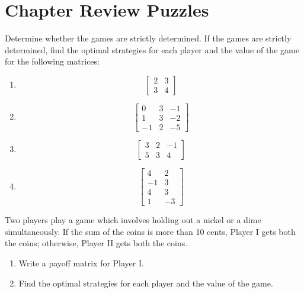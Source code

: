 \section{Chapter Review Puzzles}

\begin{puzzle}
    Determine whether the games are strictly determined. If the games are strictly determined, find the optimal strategies for each player and the value of the game for the following matrices:
    \begin{enumerate}
        \item \[
                  \begin{bmatrix}
                      2 & 3 \\
                      3 & 4
                  \end{bmatrix}
              \]
        \item \[
                  \begin{bmatrix}
                      0  & 3 & -1 \\
                      1  & 3 & -2 \\
                      -1 & 2 & -5
                  \end{bmatrix}
              \]
        \item \[
                  \begin{bmatrix}
                      3 & 2 & -1 \\
                      5 & 3 & 4
                  \end{bmatrix}
              \]
        \item
              \[
                  \begin{bmatrix}
                      4  & 2  \\
                      -1 & 3  \\
                      4  & 3  \\
                      1  & -3
                  \end{bmatrix}
              \]
    \end{enumerate}
\end{puzzle}

\begin{puzzle}
    Two players play a game which involves holding out a nickel or a dime simultaneously. If the sum of the coins is more than 10 cents, Player I gets both the coins; otherwise, Player II gets both the coins.
    \begin{enumerate}
        \item Write a payoff matrix for Player I.
        \item Find the optimal strategies for each player and the value of the game.
    \end{enumerate}
\end{puzzle}

